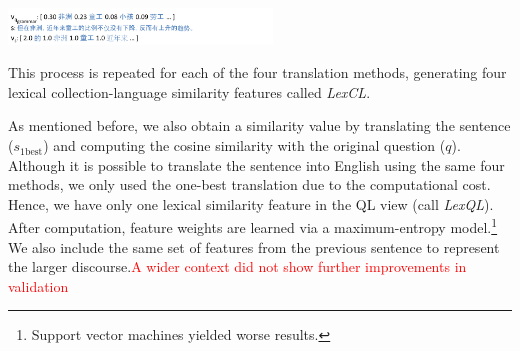 \documentclass{sig-alternate-05-2015}
\newcommand{\red}[1]{\textcolor{red}{#1}}
\begin{document}
\includegraphics[width=7cm]{example2.pdf}

This process is repeated for each of the four translation methods, generating four lexical collection-language similarity features 
called \emph{LexCL}.


As mentioned before, we also obtain a similarity value by translating the sentence ($s_{\textrm{1best}}$) 
and computing the cosine similarity with the original question ($q$). Although it is possible to translate the 
sentence into English using the same four methods, we only used the one-best translation due to the computational 
cost. Hence, we have only one lexical similarity feature in the QL view (call \emph{LexQL}).
After computation, feature weights are learned via a maximum-entropy model.\footnote{Support vector machines 
yielded worse results.} We also include the 
same set of features from the previous sentence to represent the larger discourse.\red{A wider context did not
show further improvements in validation}

\end{document}
